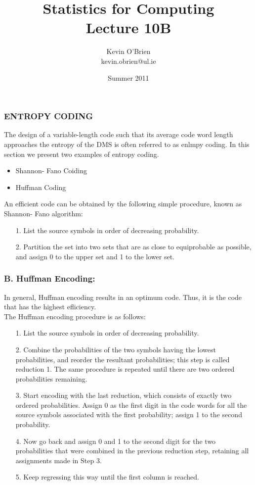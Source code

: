 \documentclass[a4]{beamer}
\title[MA4413t]{Statistics for Computing \\ {\normalsize Lecture 10B}}
\author[Kevin O'Brien]{Kevin O'Brien \\ {\scriptsize kevin.obrien@ul.ie}}
\date{Summer 2011}
\institute[Maths \& Stats]{Dept. of Mathematics \& Statistics, \\ University \textit{of} Limerick}
\begin{document}
\begin{frame}
\frametitle{ ENTROPY CODING}
The design of a variable-length code such that its average code word length approaches the
entropy of the DMS is often referred to as enlmpy coding. In this section we present two examples of
entropy coding.
\begin{itemize}
	\item Shannon- Fano Coiding
	\item Huffman Coding
\end{itemize}
\end{frame}
\begin{frame}
An efficient code can be obtained by the following simple procedure, known as
Shannon- Fano algorithm:
\begin{itemize}
\item[1.] List the source symbols in order of decreasing probability.
\item[2.] Partition the set into two sets that are as close to equiprobable as possible, and assign 0 to the
upper set and 1 to the lower set.
\end{itemize}
\end{frame}

\begin{frame}\frametitle{B. Huffman Encoding:}
In general, Huffman encoding results in an optimum code. Thus, it is the code that has the highest
efliciency.\\ The Huffman encoding procedure is as follows:
\begin{itemize}\item[1.] List the source symbols in order of decreasing probability.
\item[2.] Combine the probabilities of the two symbols having the lowest probabilities, and reorder
the resultant probabilities; this step is called reduction 1. The same procedure is repeated until
there are two ordered probabilities remaining.
\item[3.] Start encoding with the last reduction, which consists of exactly two ordered probabilities. Assign
0 as the first digit in the code words for all the source symbols associated with the first probability;
assign 1 to the second probability.
\item[4.] Now go back and assign 0 and 1 to the second digit for the two probabilities that were combined
in the previous reduction step, retaining all assignments made in Step 3.
\item[5.] Keep regressing this way until the first column is reached.
\end{itemize}
\end{frame}
\end{document}
